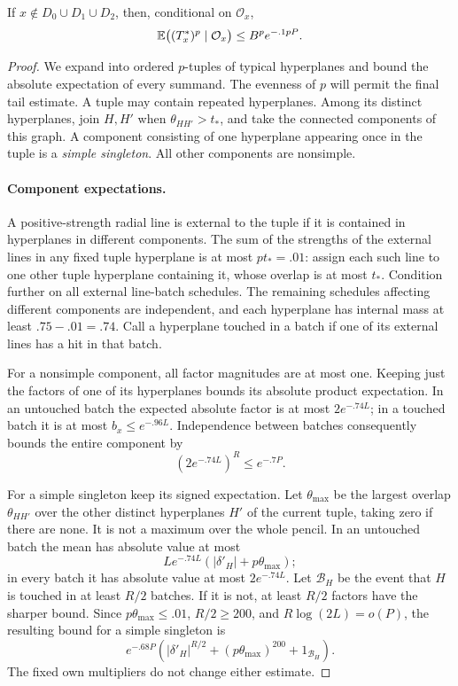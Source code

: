 \begin{lemma}\label{learn:high-moment}
If $x\notin D_0\cup D_1\cup D_2$, then, conditional on
$\mathcal O_x$,
\[
 \mathbb E\bigl((T_x^*)^p\mid\mathcal O_x\bigr)
 \le B^p e^{-.1pP}.
\]
\end{lemma}

\begin{proof}
We expand into ordered $p$-tuples of typical hyperplanes and bound the
absolute expectation of every summand. The evenness of $p$ will permit
the final tail estimate. A tuple may contain repeated hyperplanes.
Among its distinct hyperplanes, join $H,H'$ when
$\theta_{HH'}>t_*$, and take the connected components of this graph.
A component consisting of one hyperplane appearing once in the tuple
is a \emph{simple singleton}. All other components are nonsimple.

\paragraph{Component expectations.}
A positive-strength radial line is external to the tuple if it is
contained in hyperplanes in different components. The sum of the
strengths of the external lines in any fixed tuple hyperplane is at
most $pt_*=.01$: assign each such line to one other tuple hyperplane
containing it, whose overlap is at most $t_*$. Condition further on
all external line-batch schedules. The remaining schedules affecting
different components are independent, and each hyperplane has internal
mass at least $.75-.01=.74$. Call a hyperplane touched in a batch if
one of its external lines has a hit in that batch.

For a nonsimple component, all factor magnitudes are at most one.
Keeping just the factors of one of its hyperplanes bounds its absolute
product expectation. In an untouched batch the expected absolute
factor is at most $2e^{-.74L}$; in a touched batch it is at most
$b_x\le e^{-.96L}$. Independence between batches consequently bounds
the entire component by
\begin{equation}\label{learn:nonsimple-attenuation}
 (2e^{-.74L})^R\le e^{-.7P}.
\end{equation}

For a simple singleton keep its signed expectation. Let
$\theta_{\max}$ be the largest overlap $\theta_{HH'}$ over the other
distinct hyperplanes $H'$ of the current tuple, taking zero if there
are none. It is not a maximum over the whole pencil. In an untouched
batch the mean has absolute value at
most
\[
 Le^{-.74L}(|\delta'_H|+p\theta_{\max});
\]
in every batch it has absolute value at most $2e^{-.74L}$.
Let $\mathcal B_H$ be the event that $H$ is touched in at least
$R/2$ batches. If it is not, at least $R/2$ factors have the sharper
bound. Since $p\theta_{\max}\le .01$, $R/2\ge200$, and
$R\log(2L)=o(P)$, the resulting bound for a simple singleton is
\begin{equation}\label{learn:simple-attenuation}
 e^{-.68P}\left(
 |\delta'_H|^{R/2}+(p\theta_{\max})^{200}+1_{\mathcal B_H}
 \right).
\end{equation}
The fixed own multipliers do not change either estimate.


\end{proof}
